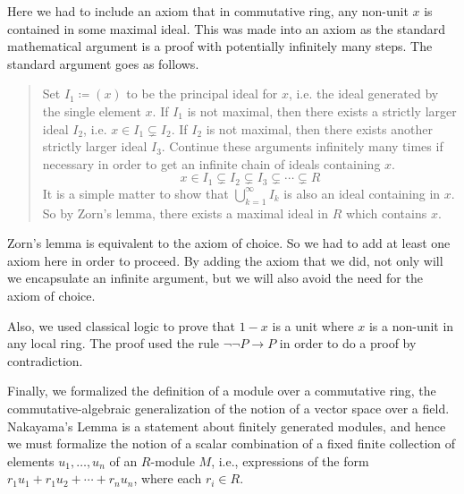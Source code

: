 \documentclass{article}
\begin{document}
Here we had to include an axiom that in commutative ring, any non-unit \(x\) is
contained in some maximal ideal. This was made into an axiom as the standard
mathematical argument is a proof with potentially infinitely many steps. The
standard argument goes as follows.
\begin{quote}
    Set \(I_{1}\coloneqq (x)\) to be the principal ideal for \(x\), i.e. the
    ideal generated by the single element \(x\). If \(I_{1}\) is not maximal,
    then there exists a strictly larger ideal \(I_{2}\), i.e.
    \(x\in I_{1}\subsetneq I_{2}\). If \(I_{2}\) is not maximal, then there
    exists another strictly larger ideal \(I_{3}\). Continue these arguments
    infinitely many times if necessary in order to get an infinite chain of
    ideals containing \(x\).
    \[x\in I_{1}\subsetneq I_{2}\subsetneq I_{3}\subsetneq\cdots\subsetneq R\]
    It is a simple matter to show that \(\bigcup_{k=1}^{\infty} I_{k}\) is also
    an ideal containing in \(x\). So by Zorn's lemma, there exists a maximal
    ideal in \(R\) which contains \(x\).
\end{quote}
Zorn's lemma is equivalent to the axiom of choice. So we had to add at least
one axiom here in order to proceed. By adding the axiom that we did, not only
will we encapsulate an infinite argument, but we will also avoid the need for
the axiom of choice.

Also, we used classical logic to prove that \(1 - x\) is a unit where \(x\) is
a non-unit in any local ring. The proof used the rule \(\neg\neg P\rightarrow
P\) in order to do a proof by contradiction.



Finally, we formalized the definition of a module over a commutative ring, the  commutative-algebraic generalization of the notion of a vector
space over a field.  Nakayama's Lemma is a statement about finitely generated modules, and hence we must formalize the notion of a scalar combination of a fixed finite collection of elements $u_1, \ldots, u_n$ of an $R$-module $M$, i.e., expressions of the form  
$r_1 u_1 + r_1 u_2 + \cdots + r_n u_n$, where each $r_i \in R$.
\end{document}
